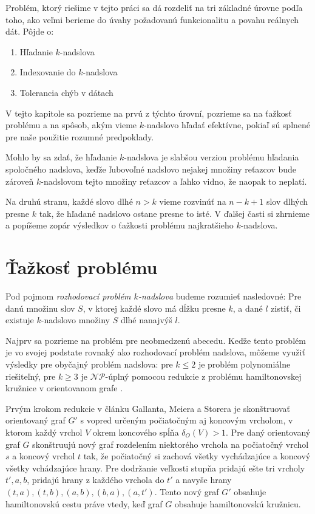 Problém, ktorý riešime v tejto práci sa dá rozdeliť na tri základné úrovne podľa toho,
ako veľmi berieme do úvahy požadovanú funkcionalitu a povahu reálnych dát. Pôjde o:
\begin{enumerate}
    \item Hľadanie $k$-nadslova
    \item Indexovanie do $k$-nadslova
    \item Tolerancia chýb v dátach
\end{enumerate}
V tejto kapitole sa pozrieme na prvú z týchto úrovní, pozrieme sa na ťažkosť problému
a na spôsob, akým vieme $k$-nadslovo hľadať efektívne, pokiaľ sú splnené pre naše
použitie rozumné predpoklady.

Mohlo by sa zdať, že hľadanie $k$-nadslova je slabšou verziou problému hľadania
spoločného nadslova, keďže ľubovoľné nadslovo nejakej množiny reťazcov bude zároveň
$k$-nadslovom tejto množiny reťazcov a ľahko vidno, že naopak to neplatí.

Na druhú stranu, každé slovo dlhé $n > k$ vieme rozvinúť na $n - k + 1$ slov dlhých
presne $k$ tak, že hľadané nadslovo ostane presne to isté. V ďalšej časti si zhrnieme
a popíšeme zopár výsledkov o ťažkosti problému najkratšieho $k$-nadslova.


\section{Ťažkosť problému}

\begin{defn}
Pod pojmom \emph{rozhodovací problém $k$-nadslova} budeme rozumieť nasledovné:
Pre danú množinu slov $S$, v ktorej každé slovo má dĺžku presne $k$,
a dané $l$ zistiť, či existuje $k$-nadslovo množiny $S$ dlhé nanajvýš $l$.
\end{defn}

Najprv sa pozrieme na problém pre neobmedzenú abecedu. Keďže tento problém je
vo svojej podstate rovnaký ako rozhodovací problém nadslova, môžeme využiť výsledky
pre obyčajný problém nadslova: pre $k \leq 2$ je problém polynomiálne riešiteľný,
pre $k \ge 3$ je $\mathcal{NP}$-úplný pomocou redukcie z problému hamiltonovskej
kružnice v orientovanom grafe \cite{superstring}.

Prvým krokom redukcie v článku Gallanta, Meiera a Storera je skonštruovať orientovaný
graf $G'$ s vopred určeným počiatočným aj koncovým vrcholom, v ktorom každý vrchol $V$
okrem koncového spĺňa $\delta_O(V) > 1$. Pre daný orientovaný graf $G$
skonštruujú nový graf rozdelením niektorého vrchola na počiatočný vrchol $s$ a
koncový vrchol $t$ tak, že počiatočný si zachová všetky vychádzajúce a koncový
všetky vchádzajúce hrany. Pre dodržanie veľkosti stupňa pridajú ešte tri vrcholy
$t', a, b$, pridajú hrany z každého vrchola do $t'$ a navyše hrany $(t, a), (t, b),
(a, b), (b, a), (a, t')$. Tento nový graf $G'$ obsahuje hamiltonovskú cestu práve vtedy,
keď graf $G$ obsahuje hamiltonovskú kružnicu.

